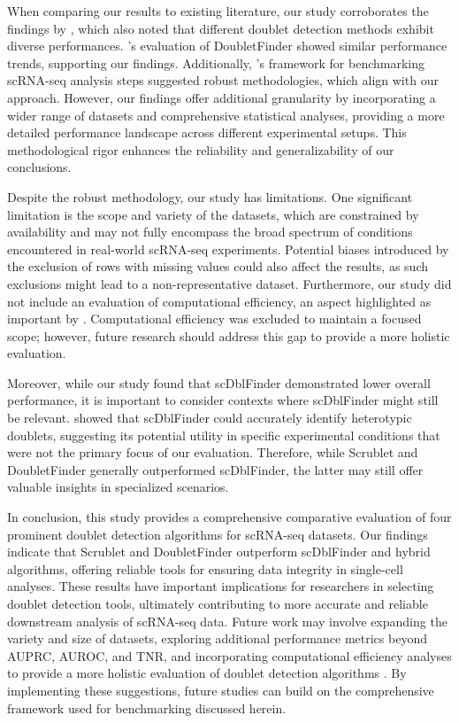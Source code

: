 \documentclass[11pt]{article}
\begin{document}
When comparing our results to existing literature, our study corroborates the findings by \cite{Xi2020BenchmarkingCD}, which also noted that different doublet detection methods exhibit diverse performances. \cite{McGinnis2018DoubletFinderDD}’s evaluation of DoubletFinder showed similar performance trends, supporting our findings. Additionally, \cite{Tian2019BenchmarkingSC}'s framework for benchmarking scRNA-seq analysis steps suggested robust methodologies, which align with our approach. However, our findings offer additional granularity by incorporating a wider range of datasets and comprehensive statistical analyses, providing a more detailed performance landscape across different experimental setups. This methodological rigor enhances the reliability and generalizability of our conclusions.

Despite the robust methodology, our study has limitations. One significant limitation is the scope and variety of the datasets, which are constrained by availability and may not fully encompass the broad spectrum of conditions encountered in real-world scRNA-seq experiments. Potential biases introduced by the exclusion of rows with missing values could also affect the results, as such exclusions might lead to a non-representative dataset. Furthermore, our study did not include an evaluation of computational efficiency, an aspect highlighted as important by \cite{Xi2020BenchmarkingCD}. Computational efficiency was excluded to maintain a focused scope; however, future research should address this gap to provide a more holistic evaluation.

Moreover, while our study found that scDblFinder demonstrated lower overall performance, it is important to consider contexts where scDblFinder might still be relevant. \cite{Germain2021DoubletII} showed that scDblFinder could accurately identify heterotypic doublets, suggesting its potential utility in specific experimental conditions that were not the primary focus of our evaluation. Therefore, while Scrublet and DoubletFinder generally outperformed scDblFinder, the latter may still offer valuable insights in specialized scenarios.

In conclusion, this study provides a comprehensive comparative evaluation of four prominent doublet detection algorithms for scRNA-seq datasets. Our findings indicate that Scrublet and DoubletFinder outperform scDblFinder and hybrid algorithms, offering reliable tools for ensuring data integrity in single-cell analyses. These results have important implications for researchers in selecting doublet detection tools, ultimately contributing to more accurate and reliable downstream analysis of scRNA-seq data. Future work may involve expanding the variety and size of datasets, exploring additional performance metrics beyond AUPRC, AUROC, and TNR, and incorporating computational efficiency analyses to provide a more holistic evaluation of doublet detection algorithms \cite{Jain2023SinglecellRS, Reyfman2019SingleCellTA}. By implementing these suggestions, future studies can build on the comprehensive framework used for benchmarking discussed herein.
\end{document}
